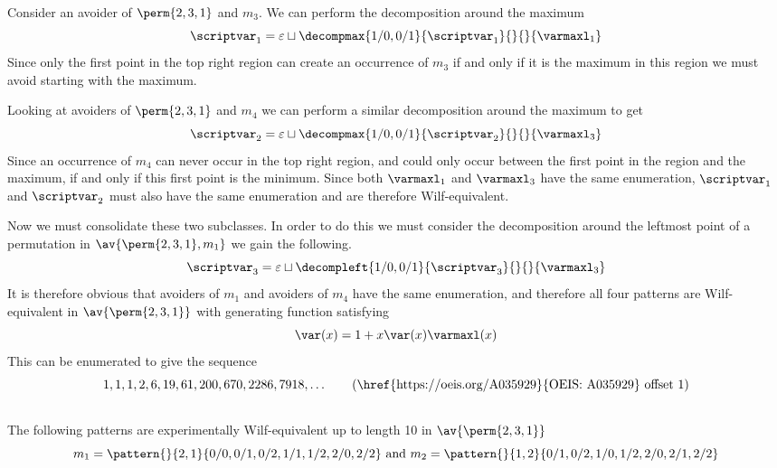 Consider an avoider of \(\perm{2,3,1}\) and \(m_3\). We can perform
the decomposition around the maximum
\begin{equation*}
    \scriptvar_1 = \varepsilon \sqcup
    \decompmax{1/0,0/1}{\scriptvar_1}{}{}{\mathcal{\varmaxl}_1}
\end{equation*}
Since only the first point in the top right region can
create an occurrence of \(m_3\) if and only if it is the
maximum in this region we must avoid starting with the maximum.

Looking at avoiders of \(\perm{2,3,1}\) and \(m_4\) we
can perform a similar decomposition around the maximum to get
\begin{equation*}
    \scriptvar_2 = \varepsilon \sqcup
    \decompmax{1/0,0/1}{\scriptvar_2}{}{}{\mathcal{\varmaxl}_3}
\end{equation*}
Since an occurrence of \(m_4\) can never occur in the
top right region, and could only occur between the first point
in the region and the maximum, if and only if this first point is the minimum.
Since both \(\mathcal{\varmaxl}_1\) and \(\mathcal{\varmaxl}_3\) have the same
enumeration, \(\scriptvar_1\) and \(\scriptvar_2\) must also have
the same enumeration and are therefore Wilf-equivalent.

Now we must consolidate these two subclasses. In order to do this we must
consider the decomposition around the leftmost point of a permutation in
\(\av{\perm{2,3,1},m_1}\) we gain the following.
\begin{equation*}
    \scriptvar_3 = \varepsilon \sqcup
    \decompleft{1/0,0/1}{\scriptvar_3}{}{}{\mathcal{\varmaxl}_3}
\end{equation*}
It is therefore obvious that avoiders of \(m_1\) and avoiders of \(m_4\)
have the same enumeration, and therefore all four patterns are Wilf-equivalent
in \(\av{\perm{2,3,1}}\) with generating function satisfying
\begin{equation*}
    \var(x) = 1 + x\var(x)\varmaxl(x)
\end{equation*}
This can be enumerated to give the sequence
\begin{equation*}
    1, 1, 1, 2, 6, 19, 61, 200, 670, 2286, 7918,\dotsc \tag{\href{https://oeis.org/A035929}{OEIS: A035929} offset 1}
\end{equation*}

\subsection{}
\nextvar
The following patterns are experimentally Wilf-equivalent up to length 10 in
\(\av{\perm{2,3,1}}\)
\begin{equation*}
    m_1 = \pattern{}{2,1}{0/0,0/1,0/2,
                    1/1,1/2,
                    2/0,2/2}
    \text{ and }
    m_2 = \pattern{}{1,2}{0/1,0/2,
                    1/0,1/2,
                    2/0,2/1,2/2}
\end{equation*}

